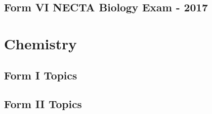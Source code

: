 \documentclass[pdftex,10pt,a4paper,twoside]{report}
\begin{document}
%
%
%
%
%
%
%

%
%
%
%
%
%

\section{Form VI NECTA Biology Exam - 2017}

\chapter{Chemistry}


\section{Form I Topics}







\section{Form II Topics}







\end{document}
